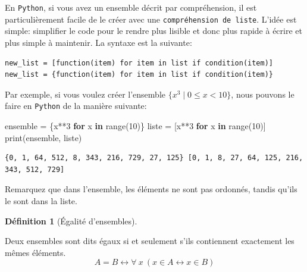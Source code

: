 \documentclass[
  letterpaper,
]{scrbook}
\newenvironment{Shaded}{\begin{snugshade}}{\end{snugshade}}
\newcommand{\BuiltInTok}[1]{\textcolor[rgb]{0.00,0.50,0.00}{#1}}
\newcommand{\ControlFlowTok}[1]{\textcolor[rgb]{0.00,0.44,0.13}{\textbf{#1}}}
\newcommand{\DecValTok}[1]{\textcolor[rgb]{0.25,0.63,0.44}{#1}}
\newcommand{\KeywordTok}[1]{\textcolor[rgb]{0.00,0.44,0.13}{\textbf{#1}}}
\newcommand{\NormalTok}[1]{\textcolor[rgb]{0.00,0.44,0.13}{#1}}
\newcommand{\OperatorTok}[1]{\textcolor[rgb]{0.40,0.40,0.40}{#1}}
\newcommand{\set}[1]{\{#1\}}
\theoremstyle{plain}
\theoremstyle{definition}
\newtheorem{definition}{Définition}[chapter]
\theoremstyle{definition}
\theoremstyle{remark}
\begin{document}
En \texttt{Python}, si vous avez un ensemble décrit par compréhension,
il est particulièrement facile de le créer avec une
\texttt{compréhension\ de\ liste}. L'idée est simple: simplifier le code
pour le rendre plus lisible et donc plus rapide à écrire et plus simple
à maintenir. La syntaxe est la suivante:

\begin{verbatim}
new_list = [function(item) for item in list if condition(item)]
new_list = {function(item) for item in list if condition(item)}
\end{verbatim}

Par exemple, si vous voulez créer l'ensemble
\(\set{x^3\mid 0\leq x < 10}\), nous pouvons le faire en \texttt{Python}
de la manière suivante:

\hypertarget{comprehension-de-liste}{}
\begin{Shaded}
\begin{Highlighting}[]
\NormalTok{ensemble }\OperatorTok{=}\NormalTok{ \{x}\OperatorTok{**}\DecValTok{3} \ControlFlowTok{for}\NormalTok{ x }\KeywordTok{in} \BuiltInTok{range}\NormalTok{(}\DecValTok{10}\NormalTok{)\}}
\NormalTok{liste }\OperatorTok{=}\NormalTok{ [x}\OperatorTok{**}\DecValTok{3} \ControlFlowTok{for}\NormalTok{ x }\KeywordTok{in} \BuiltInTok{range}\NormalTok{(}\DecValTok{10}\NormalTok{)]}
\BuiltInTok{print}\NormalTok{(ensemble, liste)}
\end{Highlighting}
\end{Shaded}

\begin{verbatim}
{0, 1, 64, 512, 8, 343, 216, 729, 27, 125} [0, 1, 8, 27, 64, 125, 216, 343, 512, 729]
\end{verbatim}

\begin{tcolorbox}[enhanced jigsaw, colbacktitle=quarto-callout-note-color!10!white, toptitle=1mm, left=2mm, toprule=.15mm, opacityback=0, bottomrule=.15mm, breakable, coltitle=black, title=\textcolor{quarto-callout-note-color}{\faInfo}\hspace{0.5em}{Note}, colframe=quarto-callout-note-color-frame, arc=.35mm, titlerule=0mm, rightrule=.15mm, opacitybacktitle=0.6, leftrule=.75mm, bottomtitle=1mm, colback=white]

Remarquez que dans l'ensemble, les éléments ne sont pas ordonnés, tandis
qu'ils le sont dans la liste.

\end{tcolorbox}

\begin{definition}[Égalité
d'ensembles]\protect\hypertarget{def-egalite-ensembles}{}\label{def-egalite-ensembles}

Deux ensembles sont dits égaux si et seulement s'ils contiennent
exactement les mêmes éléments. \[
A=B \leftrightarrow \forall\ x\ (x\in A \leftrightarrow x\in B)
\]

\end{definition}
\end{document}
